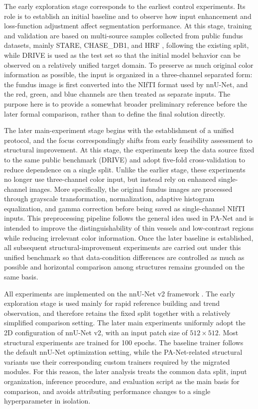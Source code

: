 \documentclass[a4paper,11pt]{article}
\begin{document}
The early exploration stage corresponds to the earliest control experiments. Its role is to establish an initial baseline and to observe how input enhancement and loss-function adjustment affect segmentation performance. At this stage, training and validation are based on multi-source samples collected from public fundus datasets, mainly STARE, CHASE\_DB1, and HRF \cite{hoover2000locating,chasedb12013,budai2013robust}, following the existing split, while DRIVE is used as the test set so that the initial model behavior can be observed on a relatively unified target domain. To preserve as much original color information as possible, the input is organized in a three-channel separated form: the fundus image is first converted into the NIfTI format used by nnU-Net, and the red, green, and blue channels are then treated as separate inputs. The purpose here is to provide a somewhat broader preliminary reference before the later formal comparison, rather than to define the final solution directly.

The later main-experiment stage begins with the establishment of a unified protocol, and the focus correspondingly shifts from early feasibility assessment to structural improvement. At this stage, the experiments keep the data source fixed to the same public benchmark (DRIVE) and adopt five-fold cross-validation to reduce dependence on a single split. Unlike the earlier stage, these experiments no longer use three-channel color input, but instead rely on enhanced single-channel images. More specifically, the original fundus images are processed through grayscale transformation, normalization, adaptive histogram equalization, and gamma correction before being saved as single-channel NIfTI inputs. This preprocessing pipeline follows the general idea used in PA-Net \cite{luo2025panet} and is intended to improve the distinguishability of thin vessels and low-contrast regions while reducing irrelevant color information. Once the later baseline is established, all subsequent structural-improvement experiments are carried out under this unified benchmark so that data-condition differences are controlled as much as possible and horizontal comparison among structures remains grounded on the same basis.

All experiments are implemented on the nnU-Net v2 framework \cite{isensee2021nnunet}. The early exploration stage is used mainly for rapid reference building and trend observation, and therefore retains the fixed split together with a relatively simplified comparison setting. The later main experiments uniformly adopt the 2D configuration of nnU-Net v2, with an input patch size of \(512 \times 512\). Most structural experiments are trained for 100 epochs. The baseline trainer follows the default nnU-Net optimization setting, while the PA-Net-related structural variants use their corresponding custom trainers required by the migrated modules. For this reason, the later analysis treats the common data split, input organization, inference procedure, and evaluation script as the main basis for comparison, and avoids attributing performance changes to a single hyperparameter in isolation.
\end{document}
